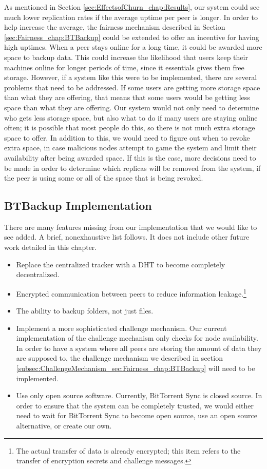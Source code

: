 \documentclass[12pt]{report}
\begin{document}
As mentioned in Section \ref{sec:EffectsofChurn_chap:Results}, our system could see much lower replication rates if the average uptime per peer is longer. In order to help increase the average, the fairness mechanism described in Section \ref{sec:Fairness_chap:BTBackup} could be extended to offer an incentive for having high uptimes. When a peer stays online for a long time, it could be awarded more space to backup data. This could increase the likelihood that users keep their machines online for longer periods of time, since it essentials gives them free storage. However, if a system like this were to be implemented, there are several problems that need to be addressed. If some users are getting more storage space than what they are offering, that means that some users would be getting less space than what they are offering. Our system would not only need to determine who gets less storage space, but also what to do if many users are staying online often; it is possible that most people do this, so there is not much extra storage space to offer. In addition to this, we would need to figure out when to revoke extra space, in case malicious nodes attempt to game the system and limit their availability after being awarded space. If this is the case, more decisions need to be made in order to determine which replicas will be removed from the system, if the peer is using some or all of the space that is being revoked.

\subsection{BTBackup Implementation}

There are many features missing from our implementation that we would like to see added. A brief, nonexhaustive list follows. It does not include other future work detailed in this chapter.

\begin{itemize}
    \item Replace the centralized tracker with a DHT to become completely decentralized.
    \item Encrypted communication between peers to reduce information leakage.\footnote{The actual transfer of data is already encrypted; this item refers to the transfer of encryption secrets and challenge messages.}
    \item The ability to backup folders, not just files.
    \item Implement a more sophisticated challenge mechanism. Our current implementation of the challenge mechanism only checks for node availability. In order to have a system where all peers are storing the amount of data they are supposed to, the challenge mechanism we described in section \ref{subsec:ChallengeMechanism_sec:Fairness_chap:BTBackup} will need to be implemented.
    \item Use only open source software. Currently, BitTorrent Sync is closed source. In order to ensure that the system can be completely trusted, we would either need to wait for BitTorrent Sync to become open source, use an open source alternative, or create our own.
\end{itemize}
\end{document}
